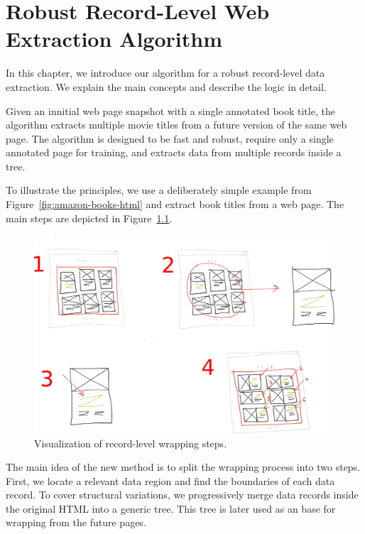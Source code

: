 \chapter{Robust Record-Level Web Extraction Algorithm}
\label{ch:algorithm}

In this chapter, we introduce our algorithm for a robust record-level data extraction. We explain the main concepts and describe the logic in detail.

Given an innitial web page snapshot with a single annotated book title, the algorithm extracts multiple movie titles from a future version of the same web page. The algorithm is designed to be fast and robust, require only a single annotated page for training, and extracts data from multiple records inside a tree.

To illustrate the principles, we use a deliberately simple example from Figure~\ref{fig:amazon-books-html} and extract book titles from a web page. The main steps are depicted in Figure~\ref{fig:algorithm}.

\begin{figure}[h]
	\centering
	\includegraphics[width=1.0\textwidth]{figures/algorithm}
	\caption{Visualization of record-level wrapping steps.}
	\label{fig:algorithm}
\end{figure}

The main idea of the new method is to split the wrapping process into two steps. First, we locate a relevant data region and find the boundaries of each data record. To cover structural variations, we progressively merge data records inside the original HTML into a generic tree. This tree is later used as an base for wrapping from the future pages. 

